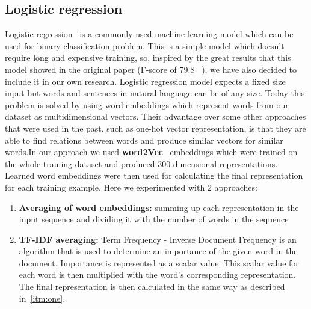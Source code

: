 \documentclass[10pt, a4paper]{article}
\begin{document}
\subsection{Logistic regression}
Logistic regression~\citep{logreg} is a commonly used machine learning model which can be used for binary classification problem.
This is a simple model which doesn't require long and expensive training, so, inspired by the great results that this model showed in the original paper (F-score of 79.8 ~\citep{turcan-mckeown-2019-dreaddit}), we have also decided to
include it in our own research.
\hfill \break
\hfill \break
Logistic regression model expects a fixed size input but words and sentences in natural language can be of any size.
Today this problem is solved by using word embeddings which represent words from our dataset as multidimensional vectors. Their advantage over some other approaches that were used in the past, such as one-hot vector representation, is that they are able to find relations between words and produce similar vectors for similar words.In our approach we used \textbf{word2Vec}~\citep{mikolov2013efficient} embeddings which were trained on the whole training dataset and produced 300-dimensional representations.
Learned word embeddings were then used for calculating the final representation for each training example.
Here we experimented with 2 approaches:
\begin{enumerate}
    \item \label{itm:one} \textbf{Averaging of word embeddings:} summing up each representation in the input sequence and dividing it with the number of words in the sequence
    \item \textbf{TF-IDF averaging:} Term Frequency - Inverse Document Frequency is an algorithm that is used to determine an importance of the given word in the document.
    Importance is represented as a scalar value.
     This scalar value for each word is then multiplied with the word's corresponding representation.
    The final representation is then calculated in the same way as described in~\ref{itm:one}.

\end{enumerate}
\end{document}
